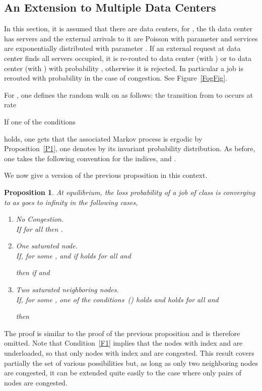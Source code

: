\documentclass{amsart}
\newtheorem{proposition}{Proposition}
\begin{document}
{
\subsection{An Extension to Multiple Data Centers}\label{ExtSec}
In this section, it is assumed that there are  data centers, for , the th data center has  servers and the external arrivals to it are Poisson with parameter  and services are exponentially distributed with parameter . If an external request at data center  finds all  servers occupied, it is re-routed to data center  (with )  or to data center  (with ) with probability , otherwise it is rejected. In particular a job is rerouted with probability  in the case of congestion.  See Figure~\ref{FogFig}.

For  , one defines the random walk  on  as follows: the transition from  to  occurs at rate

If one of the conditions 

holds, one gets that the associated Markov process is ergodic by Proposition~\ref{P1}, one denotes by  its invariant probability distribution. 
As before, one takes the following convention for the indices,  and .

We now give a version of the previous proposition in this context. 
\begin{proposition}\label{propExt}
At equilibrium, the loss probability of a job of class  is converging to  as  goes to infinity in the following cases,
\begin{enumerate}
\item No Congestion.\\
If  for all  then .
\item One saturated node.\\
If, for some ,   and if  holds for all  and 

then  if  and 
\item Two saturated neighboring nodes.\\
If, for some ,  one of the conditions~() holds and  holds for all  and

then

\end{enumerate}
\end{proposition}
The proof is similar to the proof of the previous proposition and is therefore omitted. Note that Condition~\eqref{F1} implies that the nodes with index  and  are underloaded, so that only nodes with index  and  are congested.  This result covers  partially the set of various possibilities but, as long as only two neighboring nodes are congested, it can be extended quite easily to the case where only pairs of nodes are congested. 

}
\end{document}
